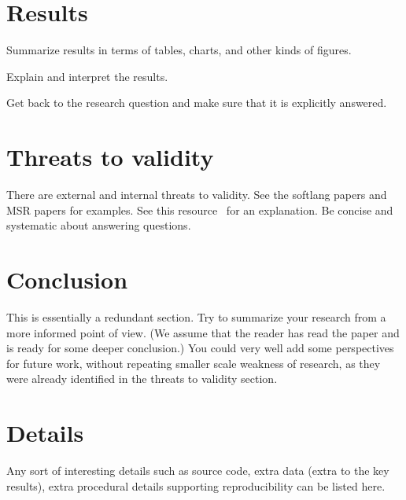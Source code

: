\documentclass{llncs}
\begin{document}
\section{Results}

\noindent
Summarize results in terms of tables, charts, and other kinds of
figures.

Explain and interpret the results.

Get back to the research question and make sure that it is explicitly answered.


\section{Threats to validity}

There are external and internal threats to validity. See the softlang
papers and MSR papers for examples. See this resource~\cite{Michael04}
for an explanation. Be concise and systematic about answering
questions.


\section{Conclusion}

This is essentially a redundant section. Try to summarize your
research from a more informed point of view. (We assume that the
reader has read the paper and is ready for some deeper conclusion.)
You could very well add some perspectives for future work, without
repeating smaller scale weakness of research, as they were already
identified in the threats to validity section.


\appendix

\section{Details}
\label{S:details}

Any sort of interesting details such as source code, extra data (extra
to the key results), extra procedural details supporting
reproducibility can be listed here. 





\end{document}
